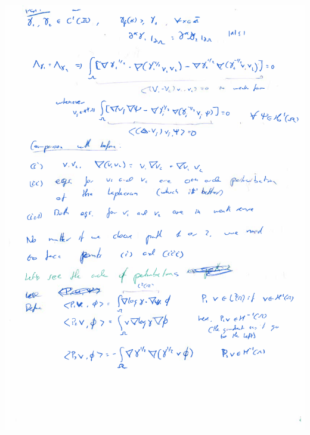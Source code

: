 \documentclass{article}
\begin{document}
\includegraphics[width=\textwidth]{screenshots/4.png}
\end{document}
